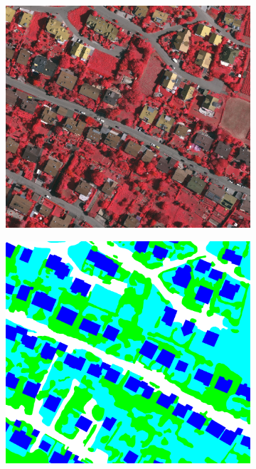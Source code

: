 \begin{figure}[htb]
 \begin{subfigure}{0.24\textwidth}
   \centering
   \includegraphics[width=1\linewidth]{fig/vai/13.JPG} 
 \end{subfigure}\vspace{1mm}
 \begin{subfigure}{0.24\textwidth}
   \centering
  \includegraphics[width=1\linewidth]{fig/vai/13_gt.png}

\end{subfigure}
\end{figure}
